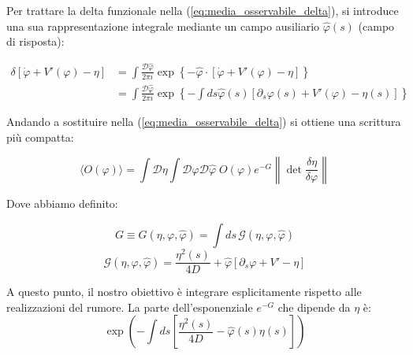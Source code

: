 Per trattare la delta funzionale nella (\ref{eq:media_osservabile_delta}), si introduce una sua rappresentazione integrale mediante un campo ausiliario $\hat{\varphi}(s)$ (campo di risposta):
\begin{tcolorbox}[
    colback=colorA!5,      
    colframe=colorA,       
    arc=3mm,               
    boxrule=1.2pt
]
\begin{align}
\delta[\dot{\varphi} + V'(\varphi) - \eta] &= \int \frac{\mathcal{D}\hat{\varphi}}{2 \pi i} \exp\left\{-\hat{\varphi} \cdot [\dot{\varphi} + V'(\varphi) - \eta] \right\} \nonumber \\ 
&=\int \frac{\mathcal{D}\hat{\varphi}}{2 \pi i} \exp\left\{-\int ds \hat{\varphi}(s)[\partial_{s}\varphi(s)+V'(\varphi)-\eta(s)]\right\}
\end{align}
\end{tcolorbox}

Andando a sostituire nella (\ref{eq:media_osservabile_delta}) si ottiene una scrittura più compatta:
\begin{tcolorbox}[
    colback=colorA!5,      
    colframe=colorA,       
    arc=3mm,               
    boxrule=1.2pt
]
\begin{equation}
\langle O(\varphi) \rangle = \int \mathcal{D}\eta \int \mathcal{D}\varphi \mathcal{D} \hat{\varphi} \; O(\varphi) e^{-G} \left\| \det \frac{\delta \eta}{\delta \varphi} \right\|
\end{equation}
\end{tcolorbox}

Dove abbiamo definito:
\begin{tcolorbox}[
    colback=colorA!5,      
    colframe=colorA,       
    arc=3mm,               
    boxrule=1.2pt
]
\begin{equation}
G \equiv G(\eta,\varphi,\hat{\varphi}) = \int ds\, \mathcal{G}(\eta,\varphi,\hat{\varphi}) 
\end{equation}
\begin{equation}
\mathcal{G}(\eta,\varphi,\hat{\varphi}) = \frac{\eta^2(s)}{4D} + \hat{\varphi}[\partial_s\varphi+V'-\eta]
\end{equation}
\end{tcolorbox}

A questo punto, il nostro obiettivo è integrare esplicitamente rispetto alle realizzazioni del rumore. La parte dell'esponenziale $e^{-G}$ che dipende da $\eta$ è:
\begin{equation}
\exp\left(-\int ds \left[\frac{\eta^2(s)}{4D} - \hat{\varphi}(s)\eta(s)\right]\right)
\end{equation}

